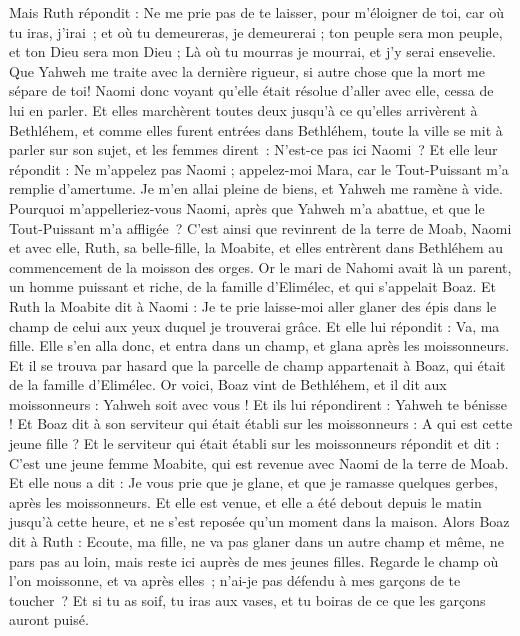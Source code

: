 \begin{multicols}{2}
Mais Ruth répondit : Ne me prie pas de te laisser, pour m’éloigner de toi, car où tu iras, j’irai ; et où tu demeureras, je demeurerai ; ton peuple sera mon peuple, et ton Dieu sera mon Dieu ;
Là où tu mourras je mourrai, et j'y serai ensevelie. Que Yahweh me traite avec la dernière rigueur, si autre chose que la mort me sépare de toi!
Naomi donc voyant qu’elle était résolue d’aller avec elle, cessa de lui en parler.
Et elles marchèrent toutes deux jusqu'à ce qu'elles arrivèrent à Bethléhem, et comme elles furent entrées dans Bethléhem, toute la ville se mit à parler sur son sujet, et les femmes dirent : N’est-ce pas ici Naomi ?
Et elle leur répondit : Ne m'appelez pas Naomi ; appelez-moi Mara, car le Tout-Puissant m'a remplie d'amertume.
Je m’en allai pleine de biens, et Yahweh me ramène à vide. Pourquoi m'appelleriez-vous Naomi, après que Yahweh m’a abattue, et que le Tout-Puissant m’a affligée ?
C'est ainsi que revinrent de la terre de Moab, Naomi et avec elle, Ruth, sa belle-fille, la Moabite, et elles entrèrent dans Bethléhem au commencement de la moisson des orges.
\VerseOne{}Or le mari de Nahomi avait là un parent, un homme puissant et riche, de la famille d'Elimélec, et qui s'appelait Boaz.
Et Ruth la Moabite dit à Naomi : Je te prie laisse-moi aller glaner des épis dans le champ de celui aux yeux duquel je trouverai grâce. Et elle lui répondit : Va, ma fille.
Elle s'en alla donc, et entra dans un champ, et glana après les moissonneurs. Et il se trouva par hasard que la parcelle de champ appartenait à Boaz, qui était de la famille d'Elimélec.
Or voici, Boaz vint de Bethléhem, et il dit aux moissonneurs : Yahweh soit avec vous ! Et ils lui répondirent : Yahweh te bénisse !
Et Boaz dit à son serviteur qui était établi sur les moissonneurs : A qui est cette jeune fille ?
Et le serviteur qui était établi sur les moissonneurs répondit et dit : C'est une jeune femme Moabite, qui est revenue avec Naomi de la terre de Moab.
Et elle nous a dit : Je vous prie que je glane, et que je ramasse quelques gerbes, après les moissonneurs. Et elle est venue, et elle a été debout depuis le matin jusqu'à cette heure, et ne s'est reposée qu'un moment dans la maison.
Alors Boaz dit à Ruth : Ecoute, ma fille, ne va pas glaner dans un autre champ et même, ne pars pas au loin, mais reste ici auprès de mes jeunes filles.
Regarde le champ où l’on moissonne, et va après elles ; n’ai-je pas défendu à mes garçons de te toucher ? Et si tu as soif, tu iras aux vases, et tu boiras de ce que les garçons auront puisé.

\end{multicols}
